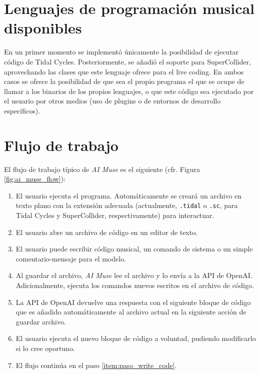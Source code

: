 
\section{Lenguajes de programación musical disponibles}

En un primer momento se implementó únicamente la posibilidad de ejecutar código de Tidal Cycles. Posteriormente, se añadió el soporte para SuperCollider, aprovechando las clases que este lenguaje ofrece para el live coding. En ambos casos se ofrece la posibilidad de que sea el propio programa el que se ocupe de llamar a los binarios de los propios lenguajes, o que este código sea ejecutado por el usuario por otros medios (uso de plugins o de entornos de desarrollo específicos).


\section{Flujo de trabajo}

El flujo de trabajo típico de \emph{AI Muse} es el siguiente (cfr. Figura \ref{fig:ai_muse_flow}):

\begin{enumerate}
    \item El usuario ejecuta el programa. Automáticamente se creará un archivo en texto plano con la extensión adecuada (actualmente, \texttt{.tidal} o \texttt{.sc}, para Tidal Cycles y SuperCollider, respectivamente) para interactuar.
    \item El usuario abre un archivo de código en un editor de texto.
    \item \label{item:paso_write_code} El usuario puede escribir código musical, un comando de sistema o un simple comentario-mensaje para el modelo.
    \item Al guardar el archivo, \emph{AI Muse} lee el archivo y lo envía a la API de OpenAI. Adicionalmente, ejecuta los comandos nuevos escritos en el archivo de código.
    \item La API de OpenAI devuelve una respuesta con el siguiente bloque de código que es añadido automáticamente al archivo actual en la siguiente acción de guardar archivo.
    \item El usuario ejecuta el nuevo bloque de código a voluntad, pudiendo modificarlo si lo cree oportuno.
    \item El flujo continúa en el paso \ref{item:paso_write_code}.
\end{enumerate}


